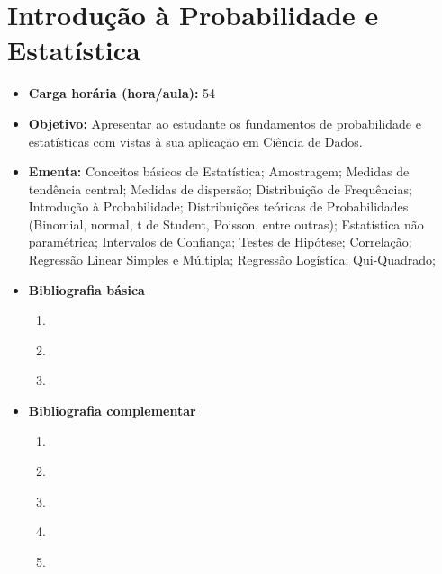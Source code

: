 \documentclass[
	10pt,				%
	openright,			%
	twoside,			%
	a4paper,			%
	english,			%
	french,				%
	brazil,				%
	sumario=tradicional
]{abntex2}
\begin{document}
\section*{Introdução à Probabilidade e Estatística}\label{4_probest}
\begin{itemize}
	\item \textbf{Carga horária (hora/aula):} 54
	\item \textbf{Objetivo:} Apresentar ao estudante os fundamentos de probabilidade e estatísticas com vistas à sua aplicação em Ciência de Dados.
	\item \textbf{Ementa:} 
	Conceitos básicos de Estatística; 
	Amostragem; 
	Medidas de tendência central; 
	Medidas de dispersão; 
	Distribuição de Frequências; 
	Introdução à Probabilidade; 
	Distribuições teóricas de Probabilidades (Binomial, normal, t de Student, Poisson, entre outras); 
	Estatística não paramétrica; 
	Intervalos de Confiança; 
	Testes de Hipótese; 
	Correlação; 
	Regressão Linear Simples e Múltipla; 
	Regressão Logística; 
	Qui-Quadrado;
	\item \textbf{Bibliografia básica}
	\begin{enumerate}
		\item \cite{larson2015estatistica}
		\item \cite{barbetta2004estatistica}
		\item \cite{magalhaes2002noccoes}
	\end{enumerate}
	\item \textbf{Bibliografia complementar}
	\begin{enumerate}
		\item \cite{hines2000probabilidade}		
		\item \cite{morettin2017estatistica}
		\item \cite{spiegel2000estatistica}
		\item \cite{iezzi2013fundamentos01}
		\item \cite{iezzi2013fundamentos03}
	\end{enumerate}
\end{itemize}


\newpage
\end{document}

